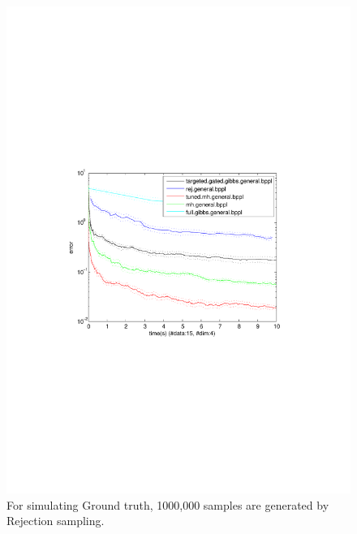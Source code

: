 \begin{figure}%
\centering
\includegraphics[width=1.2\textwidth]{pic1/data15dim4errVtime.pdf}
\caption{\footnotesize For simulating Ground truth, 1000,000 samples are generated by Rejection sampling. }
\label{fig:pref}
\end{figure}

